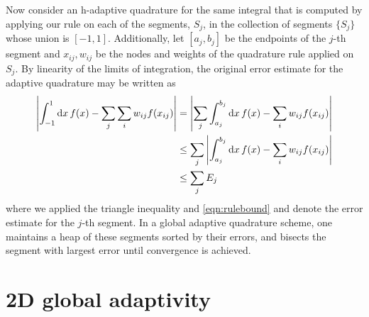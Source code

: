 \documentclass{article}
\begin{document}
Now consider an h-adaptive quadrature for the same integral that is computed by
applying our rule on each of the segments, $S_j$, in the collection of segments
$\{S_j\}$ whose union is $[-1,1]$. Additionally, let $[a_j,b_j]$ be the
endpoints of the $j$-th segment and $x_{ij}, w_{ij}$ be the nodes and weights of
the quadrature rule applied on $S_j$. By linearity of the limits of integration, the
original error estimate for the adaptive quadrature may be written as
\begin{align}
    \abs{\int_{-1}^{1} \dd{x} f(x) - \sum_{j} \sum_{i} w_{ij} f(x_{ij})}
    &= \abs{\sum_j \int_{a_j}^{b_j} \dd{x} f(x) - \sum_{i} w_{ij} f(x_{ij})}
\\  &\leq \sum_j \abs{\int_{a_j}^{b_j} \dd{x} f(x) - \sum_{i} w_{ij} f(x_{ij})}
\\  &\leq \sum_j E_{j} \label{eqn:adaptbound}
\end{align}
where we applied the triangle inequality and \eqref{eqn:rulebound} and denote
the error estimate for the $j$-th segment. In a global adaptive quadrature
scheme, one maintains a heap of these segments sorted by their errors, and
bisects the segment with largest error until convergence is achieved.

\section{2D global adaptivity}
\end{document}
